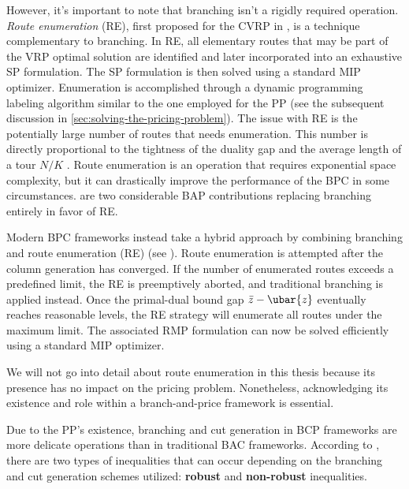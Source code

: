 \medskip

However, it's important to note that branching isn't a rigidly required operation.
\textit{Route enumeration} (RE), first proposed for the CVRP in \textcite{baldacci2008},
is a technique complementary to branching.
In RE, all elementary routes that may be part of the VRP optimal solution are identified
and later incorporated into an exhaustive SP formulation.
The SP formulation is then solved using a standard MIP optimizer.
Enumeration is accomplished through a dynamic programming labeling algorithm similar
to the one employed for the PP (see the subsequent discussion in \cref{sec:solving-the-pricing-problem}).
The issue with RE is the potentially large number of routes that needs enumeration.
This number is directly proportional
to the tightness of the duality gap
and the average length of a tour $N / K$ \parencite{toth2014}.
Route enumeration is an operation that requires exponential space complexity,
but it can drastically improve the performance of the BPC in some circumstances.
\textcite{baldacci2008,baldacci2011} are two considerable BAP contributions
replacing branching entirely in favor of RE.

Modern BPC frameworks instead take a hybrid approach by combining branching and route enumeration (RE)
(see \cite{pessoa2008, pessoa2009,contardo2014,pecin2017improved,pecin2017new,pessoa2020}).
Route enumeration is attempted after the column generation has converged.
If the number of enumerated routes exceeds a predefined limit, the RE is preemptively aborted,
and traditional branching is applied instead.
Once the primal-dual bound gap  $\bar{z} - \ubar{z}$ eventually reaches reasonable levels,
the RE strategy will enumerate all routes under the maximum limit.
The associated RMP formulation can now be solved efficiently using a standard MIP optimizer.

We will not go into detail about route enumeration in this thesis
because its presence has no impact on the pricing problem.
Nonetheless, acknowledging its existence and role within a branch-and-price framework is essential.

\medskip

Due to the PP's existence,
branching and cut generation in BCP frameworks are more delicate operations
than in traditional BAC frameworks.
According to \textcite{dearagao2003},
there are two types of inequalities that can occur
depending on the branching and cut generation schemes utilized:
\textbf{robust} and \textbf{non-robust} inequalities.


